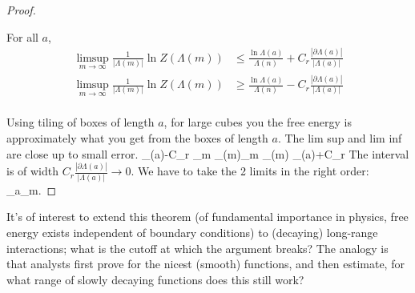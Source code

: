 \begin{proof}
\begin{clm}
For all $a$,
\begin{align*}
\limsup_{m\to\infty} \frac{1}{|\Lambda(m)|}\ln Z(\Lambda(m))& \le \frac{\ln \Lambda(a)}{\Lambda(n)} + C_r\frac{|\partial \Lambda(a)|}{|\Lambda(a)|}\\
\limsup_{m\to\infty} \frac{1}{|\Lambda(m)|}\ln Z(\Lambda(m)) & \ge \frac{\ln \Lambda(a)}{\Lambda(n)} - C_r\frac{|\partial \Lambda(a)|}{|\Lambda(a)|}\\
\end{align*}
\end{clm}
Using tiling of boxes of length $a$, for large cubes you the free energy is approximately what you get from the boxes of length $a$. 
The lim sup and lim inf are close up to small error.
\be
\psi_{\Lambda(a)}-C_r 
\le
\liminf_{m\to \infty} \psi_{\Lambda(m)}\le \limsup_{m\to \infty} \psi_{\Lambda(m)} 
\le 
\psi_{\Lambda(a)}+C_r 
\ee
The interval is of width $C_r \frac{|\partial \Lambda (a)|}{|\Lambda(a)|}\to 0$. We have to take the 2 limits in the right order:
\be
\lim_{a\to \infty}\lim_{m\to \infty}.
\ee
\end{proof}

It's of interest to extend this theorem (of fundamental importance in physics, free energy exists independent of boundary conditions) to (decaying) long-range interactions; what is the cutoff at which the argument breaks? The analogy is that analysts first prove for the nicest (smooth) functions, and then estimate, for what range of slowly decaying functions does this still work?